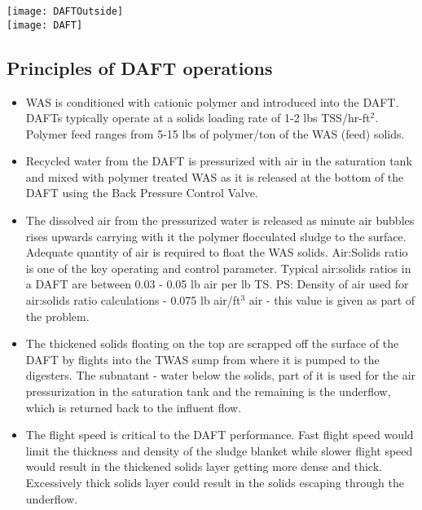 \begin{center}
\texttt{[image: DAFTOutside]}\\
\vspace{1cm}
\texttt{[image: DAFT]}

\end{center}

\subsection{Principles of DAFT operations}

\begin{itemize}
\item WAS is conditioned with cationic polymer and introduced into the DAFT.  DAFTs typically operate at a solids loading rate of 1-2 lbs TSS/hr-ft$^2$.  Polymer feed ranges from 5-15 lbs of polymer/ton of the WAS (feed) solids.
\item Recycled water from the DAFT is pressurized with air in the saturation tank and mixed with polymer treated WAS as it is released at the bottom of the DAFT using the Back Pressure Control Valve.  
\item The dissolved air from the pressurized water is released as minute air bubbles rises upwards carrying with it the polymer flocculated sludge to the surface.  Adequate quantity of air is required to float the WAS solids.  Air:Solids ratio is one of the key operating and control parameter.  Typical air:solids ratios in a DAFT are between 0.03 - 0.05 lb air per lb TS. PS: Density of air used for air:solids ratio calculations - 0.075 lb air/ft$^3$ air - this value is given as part of the problem. 
\item The thickened solids floating on the top are scrapped off the surface of the DAFT by flights into the TWAS sump from where it is pumped to the digesters. The subnatant - water below the solids, part of it is used for the air pressurization in the saturation tank and the remaining is the underflow, which is returned back to the influent flow.
\item The flight speed is critical to the DAFT performance.  Fast flight speed would limit the thickness and density of the sludge blanket while slower flight speed would result in the thickened solids layer getting more dense and thick.  Excessively thick solids layer could result in the solids escaping through the underflow.  

\end{itemize}

